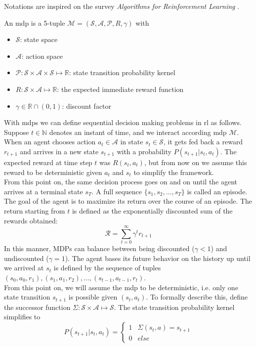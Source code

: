 Notations are inspired on the survey \textit{Algorithms for Reinforcement Learning} \cite{szepe10}.
\label{subsec:mdp}
\begin{definition}
An \gls{mdp} is a 5-tuple $\mathcal{M}=(\mathcal{S,A,P},R,\gamma)$ with
\begin{itemize}
\item $\mathcal{S}$: state space
\item $\mathcal{A}$: action space
\item $\mathcal{P}: \mathcal{S} \times \mathcal{A} \times \mathcal{S} \mapsto \mathbb{R} $: state transition probability kernel
\item $R: \mathcal{S} \times \mathcal{A} \mapsto \mathbb{R} $: the expected immediate reward function
\item $\gamma \in \mathbb{R} \cap (0,1) $: discount factor
\end{itemize}
\end{definition}

With \gls{mdp}s we can define sequential decision making problems in \gls{rl} as follows. Suppose $t \in \mathbb{N}$ denotes an instant of time, and we interact according \gls{mdp} $\mathcal{M}$. When an agent chooses action $a_t \in \mathcal{A}$ in state $s_t \in \mathcal{S}$, it gets fed back a reward $r_{t+1}$ and arrives in a new state $s_{t+1}$ with a probability $P(s_{t+1}|s_t,a_t)$. The expected reward at time step $t$ was $R(s_t,a_t)$, but from now on we assume this reward to be deterministic given $a_t$ and $s_t$ to simplify the framework. \\
From this point on, the same decision process goes on and on until the agent arrives at a terminal state $s_T$. A full sequence $\{s_1,s_2,\dotso,s_T\}$ is called an episode. The goal of the agent is to maximize its return over the course of an episode. The return starting from $t$ is defined as the exponentially discounted sum of the rewards obtained:
\begin{equation}
\mathcal{R}=\sum_{t=0}^{\infty}\gamma^t r_{t+1}
\end{equation}
In this manner, MDPs can balance between being discounted ($\gamma<1$) and undiscounted ($\gamma=1$).
The agent bases its future behavior on the history up until we arrived at $s_t$ is defined by the sequence of tuples $(s_0,a_0,r_1),(s_1,a_1,r_2), \dotso , (s_{t-1},a_{t-1},r_t)$. \\
From this point on, we will assume the \gls{mdp} to be deterministic, i.e. only one state transition $s_{t+1}$ is possible given $(s_t,a_t)$. To formally describe this, define the successor function $\Sigma: \mathcal{S} \times  \mathcal{A} \mapsto \mathcal{S}$. The state transition probability kernel simplifies to
\begin{equation}
P(s_{t+1}|s_t,a_t) = \left\{
  \begin{array}{ll}
    1 & \Sigma(s_t,a)=s_{t+1}\\
    0 & else
  \end{array}
\right.
\label{eq:det}
\end{equation} 


